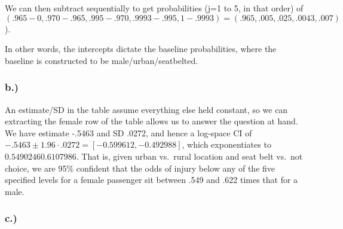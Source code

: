 \documentclass[
]{article}
\begin{document}
We can then subtract sequentially to get probabilities (j=1 to 5, in
that order) of
\((.965 - 0, .970 - .965, .995 - .970, .9993 - .995, 1 - .9993) = (.965, . 005, .025, .0043, .007)\)).

In other words, the intercepts dictate the baseline probabilities, where
the baseline is constructed to be male/urban/seatbelted.

\hypertarget{b.}{%
\subsubsection{b.)}\label{b.}}

An estimate/SD in the table assume everything else held constant, so we
can extracting the female row of the table allows us to answer the
question at hand. We have estimate -.5463 and SD .0272, and hence a
log-space CI of \(-.5463 \pm 1.96\cdot .0272 = [-0.599612, -0.492988]\),
which exponentiates to \(0.5490246 0.6107986\). That is, given urban
vs.~rural location and seat belt vs.~not choice, we are 95\% confident
that the odds of injury below any of the five specified levels for a
female passenger sit between .549 and .622 times that for a male.

\hypertarget{c.}{%
\subsubsection{c.)}\label{c.}}
\end{document}

